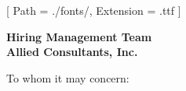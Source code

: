 


\renewcommand{\photo}[2]{}

\geometry{
  left=2cm,
  right=2cm,
  top=2cm,
  bottom=2cm
}



\makecvheader

\setmainfont{NotoSans-Regular}[
  Path = ./fonts/,
  Extension = .ttf
]

\vspace{1cm}
\indent\textbf{Hiring Management Team}\\
\indent\textbf{Allied Consultants, Inc.}

\vspace{0.5cm}

\noindent To whom it may concern:

\vspace{0.5cm}

